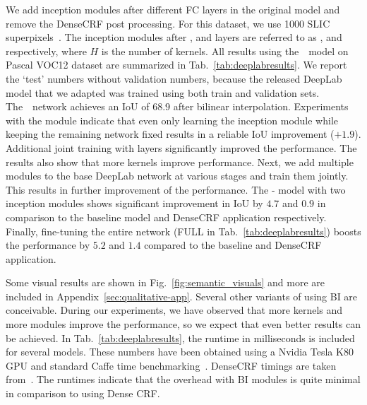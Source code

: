 We add inception modules after different FC layers in the original model and
remove the DenseCRF post processing. For this dataset, we use
1000 SLIC superpixels~\cite{achanta2012slic,gSLICr_2015}.
The inception modules after ,  and  layers are referred to as
,  and  respectively, where $H$ is the number
of kernels. All results using the~\deeplab~model on Pascal VOC12 dataset
are summarized in Tab.~\ref{tab:deeplabresults}.
We report the `test' numbers without validation numbers, because the released
DeepLab model that we adapted was trained using both train and validation sets.
The~\deeplab~network achieves an IoU of 68.9 after bilinear interpolation.
Experiments with the 
module indicate that even only learning the inception module while keeping the remaining
network fixed results in a reliable IoU improvement ($+1.9$).
Additional joint training with \fc{} layers significantly improved the performance.
The results also show that more kernels improve performance.
Next, we add multiple modules to the base DeepLab network at various stages and train them jointly. This
results in further improvement of the performance. The - model with
two inception modules shows significant improvement in IoU by $4.7$ and $0.9$
 in comparison to the baseline model and DenseCRF application respectively.
Finally, fine-tuning the entire network (FULL in Tab.~\ref{tab:deeplabresults})
boosts the performance by $5.2$ and $1.4$ compared to the baseline and DenseCRF application.

Some visual results are shown in Fig.~\ref{fig:semantic_visuals} and more
are included in Appendix~\ref{sec:qualitative-app}.
Several other variants of using BI are conceivable. During our experiments,
we have observed that more kernels and more modules improve the performance,
so we expect that even better results can be achieved.
In Tab.~\ref{tab:deeplabresults}, the runtime in milliseconds is included for several models.
These numbers have been obtained using a
Nvidia Tesla K80 GPU and standard Caffe time benchmarking~\cite{jia2014caffe}.
DenseCRF timings are taken from~\cite{chen2015semantic}. The runtimes indicate
that the overhead with BI modules is quite minimal in comparison to
using Dense CRF.

